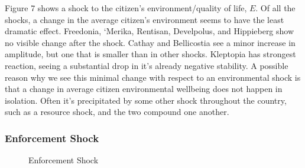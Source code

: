 \documentclass[12pt]{article}
\begin{document}
\begin{spacing}{1.5}
Figure 7 shows a shock to the citizen's environment/quality of life, $E$. Of all the shocks, a change in the average citizen's environment seems to have the least dramatic effect. Freedonia, `Merika, Rentisan, Develpolus, and Hippieberg show no visible change after the shock. Cathay and Bellicostia see a minor increase in amplitude, but one that is smaller than in other shocks. Kleptopia has strongest reaction, seeing a substantial drop in it's already negative stability. A possible reason why we see this minimal change with respect to an environmental shock is that a change in average citizen environmental wellbeing does not happen in isolation. Often it's precipitated by some other shock throughout the country, such as a resource shock, and the two compound one another. 



\subsubsection{Enforcement Shock}

\begin{figure}
\centering
\caption{Enforcement Shock}
\end{figure}


\end{spacing}
\end{document}

